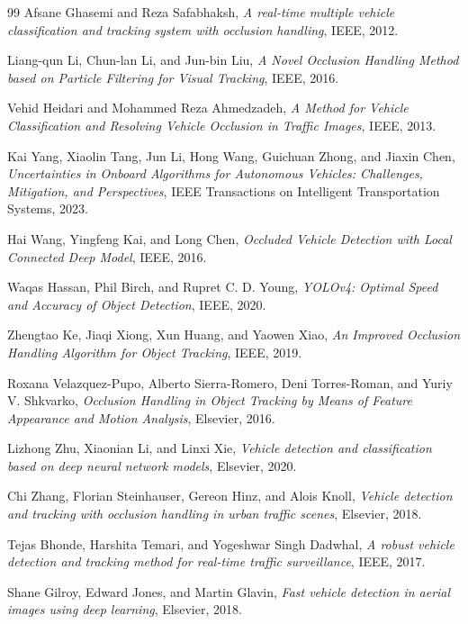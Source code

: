 \documentclass[12pt,a4paper]{report}
\theoremstyle{definition}
\theoremstyle{remark}
\begin{document}
\cleardoublepage
{}
\begin{thebibliography}{99}
	Afsane Ghasemi and Reza Safabhaksh,
	\emph{A real-time multiple vehicle classification and tracking system with occlusion handling},
	IEEE, 2012.
	
	Liang-qun Li, Chun-lan Li, and Jun-bin Liu,
	\emph{A Novel Occlusion Handling Method based on Particle Filtering for Visual Tracking},
	IEEE, 2016.
	
	Vehid Heidari and Mohammed Reza Ahmedzadeh,
	\emph{A Method for Vehicle Classification and Resolving Vehicle Occlusion in Traffic Images},
	IEEE, 2013.
	
	Kai Yang, Xiaolin Tang, Jun Li, Hong Wang, Guichuan Zhong, and Jiaxin Chen,
	\emph{Uncertainties in Onboard Algorithms for Autonomous Vehicles: Challenges, Mitigation, and Perspectives},
	IEEE Transactions on Intelligent Transportation Systems, 2023.
	
	Hai Wang, Yingfeng Kai, and Long Chen,
	\emph{Occluded Vehicle Detection with Local Connected Deep Model},
	IEEE, 2016.
	
	Waqas Hassan, Phil Birch, and Rupret C. D. Young,
	\emph{YOLOv4: Optimal Speed and Accuracy of Object Detection},
	IEEE, 2020.
	
	Zhengtao Ke, Jiaqi Xiong, Xun Huang, and Yaowen Xiao,
	\emph{An Improved Occlusion Handling Algorithm for Object Tracking},
	IEEE, 2019.
	
	Roxana Velazquez-Pupo, Alberto Sierra-Romero, Deni Torres-Roman, and Yuriy V. Shkvarko,
	\emph{Occlusion Handling in Object Tracking by Means of Feature Appearance and Motion Analysis},
	Elsevier, 2016.
	
	Lizhong Zhu, Xiaonian Li, and Linxi Xie,
	\emph{Vehicle detection and classification based on deep neural network models},
	Elsevier, 2020.
	
	Chi Zhang, Florian Steinhauser, Gereon Hinz, and Alois Knoll,
	\emph{Vehicle detection and tracking with occlusion handling in urban traffic scenes},
	Elsevier, 2018.
	
	Tejas Bhonde, Harshita Temari, and Yogeshwar Singh Dadwhal,
	\emph{A robust vehicle detection and tracking method for real-time traffic surveillance},
	IEEE, 2017.
	
	Shane Gilroy, Edward Jones, and Martin Glavin,
	\emph{Fast vehicle detection in aerial images using deep learning},
	Elsevier, 2018.
	

\end{thebibliography}
\end{document}
